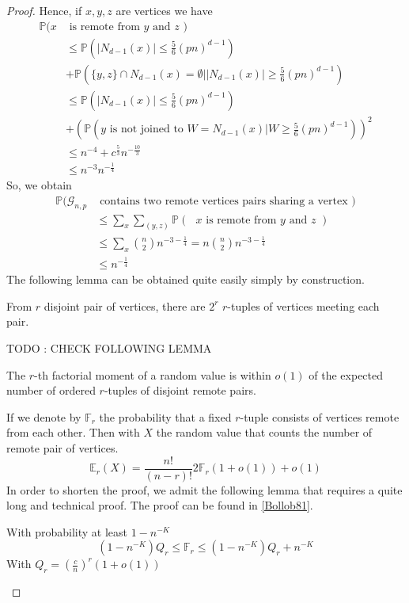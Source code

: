 \begin{proof}
	Hence, if $x, y, z$ are vertices we have
	\begin{align}
		\mathbb{P}(x&\text{ is remote from $y$ and $z$ }) 						\\	
		&\leq \mathbb{P}(|N_{d-1}(x)|\leq \frac{5}{6} (pn)^{d-1}) 					\\
		&+\mathbb{P}(\{y, z\} \cap N_{d-1}(x) = \emptyset | |N_{d-1}(x)| \geq \frac{5}{6}(pn)^{d-1} )	\\
		&\leq \mathbb{P}(|N_{d-1}(x)|\leq \frac{5}{6} (pn)^{d-1}) 					\\				
		&+(\mathbb{P}(\text{$y$ is not joined to } W = N_{d-1}(x) | W \geq \frac{5}{6} (pn)^{d-1}))^2	\\
		&\leq n^{-4} + c^{\frac{5}{3}}n^{-\frac{10}{3}}							\\
		&\leq n^{-3}n^{-\frac{1}{4}}
	\end{align}
	So, we obtain
	\begin{align}
		\mathbb{P}(\mathcal{G}_{n, p} &\text{ contains two remote vertices pairs sharing a vertex })	\\
			&\leq \sum_x\sum_{(y, z)}\mathbb{P}(\text{ $x$ is remote from $y$ and $z$ })		\\
			&\leq \sum_x \binom{n}{2}n^{-3-\frac{1}{4}} = n\binom{n}{2}n^{-3-\frac{1}{4}}		\\
			&\leq n^{-\frac{1}{4}}
	\end{align}
	The following lemma can be obtained quite easily simply by construction.
	\begin{lemma}
		From $r$ disjoint pair of vertices, there are $2^r$ $r$-tuples of vertices meeting each pair.
	\end{lemma}
	TODO : CHECK FOLLOWING LEMMA
	\begin{lemma}
		The $r$-th factorial moment of a random value is within $o(1)$ of the expected number of ordered $r$-tuples of disjoint remote pairs.
	\end{lemma}
	If we denote by $\mathbb{F}_r$ the probability that a fixed $r$-tuple consists of vertices remote from each other.
	Then with $X$ the random value that counts the number of remote pair of vertices.
	\begin{equation}
		\mathbb{E}_r(X) = \frac{n!}{(n-r)!}2\mathbb{F}_r(1+o(1)) + o(1)
	\end{equation}
	In order to shorten the proof, we admit the following lemma that requires a quite long and technical proof. The proof can be found in \ref{Bollob81}.
	\begin{lemma}
		With probability at least $1-n^{-K}$
		\begin{equation}
			(1-n^{-K})Q_r \leq \mathbb{F}_r \leq (1-n^{-K}) Q_r + n^{-K}
		\end{equation}
		With $Q_r = (\frac{c}{n})^r(1+o(1))$
	\end{lemma}


\end{proof}
